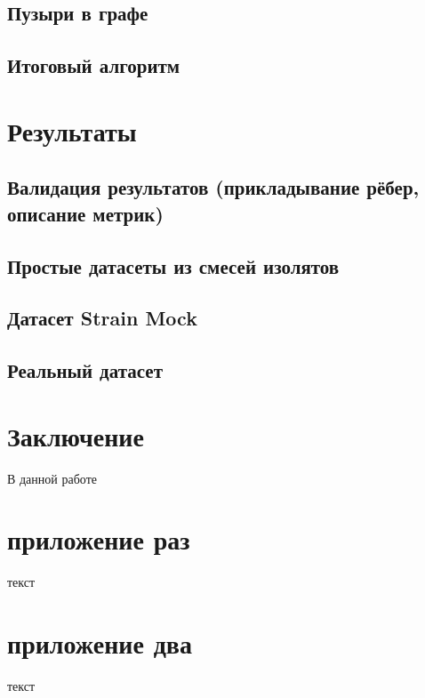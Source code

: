 \documentclass{spbau-diploma}
\begin{document}
\subsection{Пузыри в графе}
\subsection{Итоговый алгоритм}


\section{Результаты}
\subsection{Валидация результатов (прикладывание рёбер, описание метрик)}
\subsection{Простые датасеты из смесей изолятов}
\subsection{Датасет Strain Mock}
\subsection{Реальный датасет}







\section*{Заключение}
В данной работе 









\appendix

\section{приложение раз}
текст
\section{приложение два}
текст
\end{document}
